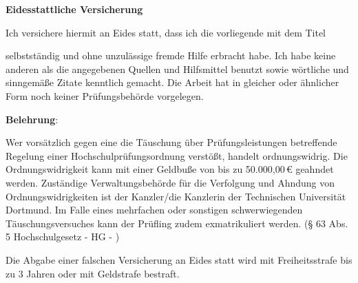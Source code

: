 \makeatletter
\cleardoublepage
\thispagestyle{empty}
\onehalfspacing
\LARGE
\begin{center}
	\textbf{Eidesstattliche Versicherung}
\end{center}

\small
\vspace{\baselineskip}
\underline{\makebox[.4\textwidth][c]{\@authorsurname,\space\@authorfirstname}}
\hspace{.25\textwidth}
\underline{\makebox[.3\textwidth][c]{\@matrikelnumber}}
\newline
{}
\hspace{.25\textwidth}

Ich versichere hiermit an Eides statt, dass ich die vorliegende \@documenttype\space mit dem Titel

\underline{\makebox[0.97\textwidth][c]{\@thesistitle}}

selbstständig und ohne unzulässige fremde Hilfe erbracht habe. Ich habe keine anderen als die 
angegebenen Quellen und Hilfsmittel benutzt sowie wörtliche und sinngemäße Zitate kenntlich 
gemacht. Die Arbeit hat in gleicher oder ähnlicher Form noch keiner Prü\-fungs\-be\-hörde 
vorgelegen. 
\vspace{\baselineskip}

\underline{}
\hspace{.25\textwidth}
\underline{\hspace{.3\textwidth}}
\newline
{}
\hspace{.25\textwidth}

\vspace{\baselineskip}

\textbf{Belehrung}: 

Wer vorsätzlich gegen eine die Täuschung über Prüfungsleistungen betreffende Regelung einer 
Hochschulprüfungsordnung verstößt, handelt ordnungswidrig. Die Ordnungswidrigkeit kann mit 
einer Geldbuße von bis zu 50.000,00\,€ geahndet werden. Zuständige Verwaltungs\-behörde für 
die Verfolgung und Ahndung von Ordnungswidrigkeiten ist der Kanzler/die Kanzlerin der 
Technischen Universität Dortmund. Im Falle eines mehrfachen oder sonstigen schwerwiegenden 
Täuschungs\-versuches kann der Prüfling zudem exmatrikuliert werden. (§ 63 Abs. 5 
Hochschulgesetz - HG - )  

Die Abgabe einer falschen Versicherung an Eides statt wird mit Freiheitsstrafe bis zu 3 Jahren 
oder mit Geldstrafe bestraft.  


